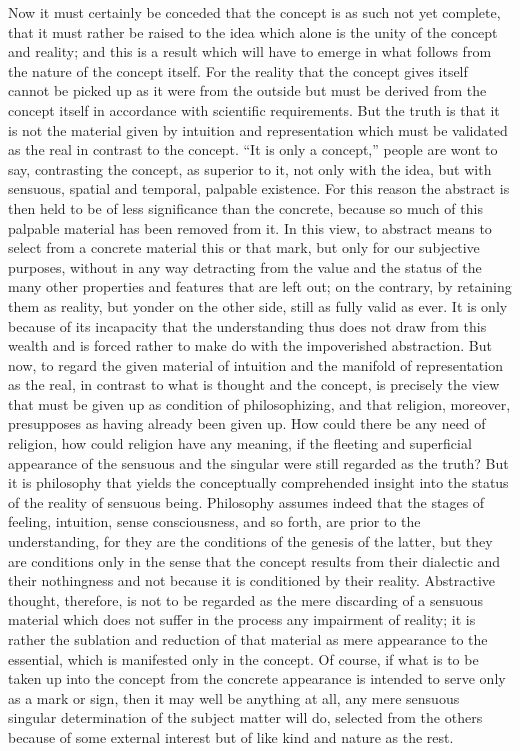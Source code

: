 Now it must certainly be conceded that
the concept is as such not yet complete,
that it must rather be raised to the idea
which alone is the unity of the concept and reality;
and this is a result which will have to emerge
in what follows from the nature of the concept itself.
For the reality that the concept gives itself
cannot be picked up as it were from the outside
but must be derived from the concept itself
in accordance with scientific requirements.
But the truth is that it is not the material
given by intuition and representation
which must be validated as the real in contrast to the concept.
“It is only a concept,” people are wont to say,
contrasting the concept, as superior to it,
not only with the idea, but with sensuous,
spatial and temporal, palpable existence.
For this reason the abstract is then held
to be of less significance than the concrete,
because so much of this palpable
material has been removed from it.
In this view, to abstract means to
select from a concrete material this or that mark,
but only for our subjective purposes,
without in any way detracting from the value
and the status of the many other
properties and features that are left out;
on the contrary, by retaining them as reality,
but yonder on the other side,
still as fully valid as ever.
It is only because of its incapacity
that the understanding thus does not
draw from this wealth
and is forced rather to make do
with the impoverished abstraction.
But now, to regard the given material of intuition
and the manifold of representation as the real,
in contrast to what is thought and the concept,
is precisely the view that must be given up as
condition of philosophizing,
and that religion, moreover, presupposes as
having already been given up.
How could there be any need of religion,
how could religion have any meaning,
if the fleeting and superficial appearance
of the sensuous and the singular were
still regarded as the truth?
But it is philosophy that yields the
conceptually comprehended insight into the
status of the reality of sensuous being.
Philosophy assumes indeed that the
stages of feeling, intuition, sense consciousness,
and so forth, are prior to the understanding,
for they are the conditions of the genesis of the latter,
but they are conditions only in the sense that
the concept results from their dialectic and their nothingness
and not because it is conditioned by their reality.
Abstractive thought, therefore, is not to be regarded as the
mere discarding of a sensuous material
which does not suffer in the process
any impairment of reality;
it is rather the sublation and reduction of that
material as mere appearance to the essential,
which is manifested only in the concept.
Of course, if what is to be taken up
into the concept from the concrete appearance is
intended to serve only as a mark or sign,
then it may well be anything at all,
any mere sensuous singular determination
of the subject matter will do,
selected from the others
because of some external interest
but of like kind and nature as the rest.

